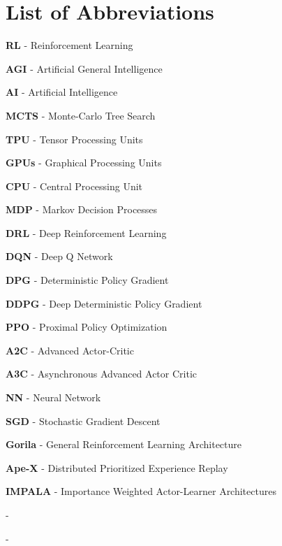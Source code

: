 \chapter*{List of Abbreviations}

\textbf{RL} - Reinforcement Learning

\noindent
\textbf{AGI} - Artificial General Intelligence

\noindent
\textbf{AI} - Artificial Intelligence

\noindent
\textbf{MCTS} - Monte-Carlo Tree Search 

\noindent
\textbf{TPU} - Tensor Processing Units

\noindent
\textbf{GPUs} - Graphical Processing Units 

\noindent
\textbf{CPU} - Central Processing Unit

\noindent
\textbf{MDP} - Markov Decision Processes

\noindent
\textbf{DRL} - Deep Reinforcement Learning

\noindent
\textbf{DQN} - Deep Q Network

\noindent
\textbf{DPG} - Deterministic Policy Gradient

\noindent
\textbf{DDPG} - Deep Deterministic Policy Gradient

\noindent
\textbf{PPO} - Proximal Policy Optimization

\noindent
\textbf{A2C} - Advanced Actor-Critic

\noindent
\textbf{A3C} - Asynchronous Advanced Actor Critic

\noindent
\textbf{NN} - Neural Network

\noindent
\textbf{SGD} - Stochastic Gradient Descent

\noindent
\textbf{Gorila} - General Reinforcement Learning Architecture

\noindent
\textbf{Ape-X} - Distributed Prioritized Experience Replay

\noindent
\textbf{IMPALA} - Importance Weighted Actor-Learner Architectures

\noindent
\textbf{} - 

\noindent
\textbf{} - 